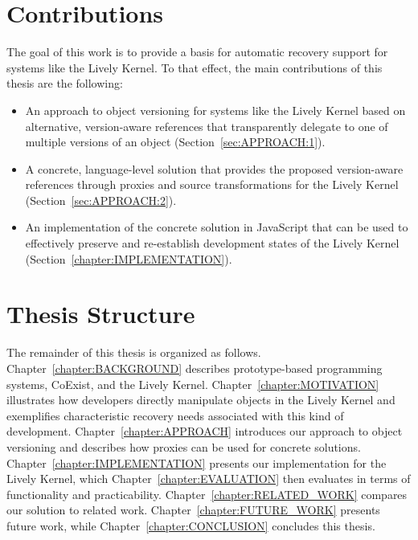 \section{Contributions}

The goal of this work is to provide a basis for automatic recovery support for systems like the Lively Kernel.
To that effect, the main contributions of this thesis are the following:

\begin{itemize}
    \item An approach to object versioning for systems like the Lively Kernel based on alternative, version-aware references that transparently delegate to one of multiple versions of an object (Section~\ref{sec:APPROACH:1}).
    \item A concrete, language-level solution that provides the proposed version-aware references through proxies and source transformations for the Lively Kernel (Section~\ref{sec:APPROACH:2}).
    \item An implementation of the concrete solution in JavaScript that can be used to effectively preserve and re-establish development states of the Lively Kernel (Section~\ref{chapter:IMPLEMENTATION}).
\end{itemize}


\section{Thesis Structure}

The remainder of this thesis is organized as follows. 
Chapter~\ref{chapter:BACKGROUND} describes prototype-based programming systems, CoExist, and the Lively Kernel.
Chapter~\ref{chapter:MOTIVATION} illustrates how developers directly manipulate objects in the Lively Kernel and exemplifies characteristic recovery needs associated with this kind of development.
Chapter~\ref{chapter:APPROACH} introduces our approach to object versioning and describes how proxies can be used for concrete solutions.
Chapter~\ref{chapter:IMPLEMENTATION} presents our implementation for the Lively Kernel, which Chapter~\ref{chapter:EVALUATION} then evaluates in terms of functionality and practicability.
Chapter~\ref{chapter:RELATED_WORK} compares our solution to related work.
Chapter~\ref{chapter:FUTURE_WORK} presents future work, while Chapter~\ref{chapter:CONCLUSION} concludes this thesis.
